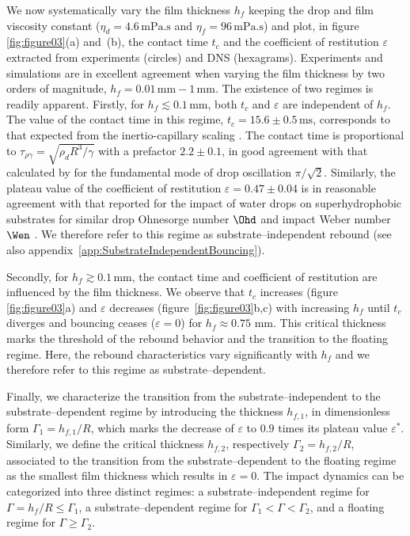 We now systematically vary the film thickness $h_{f}$ keeping the drop and film viscosity constant ($\eta_d = 4.6\,\si{\milli\pascal}.\si{\second}$ and $\eta_f = 96\,\si{\milli\pascal}.\si{\second}$) and plot, in figure \ref{fig:figure03}(a) and~(b), the contact time $t_c$ and the coefficient of restitution $\varepsilon$ extracted from experiments (circles) and  DNS (hexagrams). Experiments and simulations are in excellent agreement when varying the film thickness by two orders of magnitude, $h_{f} = 0.01\,\si{\milli\meter} - 1\,\si{\milli\meter}$. The existence of two regimes is readily apparent. 
Firstly, for $h_{f} \lesssim 0.1\,\si{\milli\meter}$, both $t_{c}$ and $\varepsilon$ are independent of $h_f$. The value of the contact time in this regime, $t_c = 15.6 \pm 0.5\,\si{\milli\second}$, corresponds to that expected from the inertio-capillary scaling \citep{wachters1966heat, richard2002contact}. The contact time is proportional to $\tau_{\rho\gamma} = \sqrt{\rho_d R^3/ \gamma}$ with a prefactor $2.2 \pm 0.1$, in good agreement with that calculated by \citet{rayleigh1879capillary} for the fundamental mode of drop oscillation $\pi/\sqrt 2$. Similarly, the plateau value of the coefficient of restitution $\varepsilon = 0.47 \pm 0.04$ is in reasonable agreement with that reported for the impact of water drops on superhydrophobic substrates for similar drop Ohnesorge number $\Ohd$ and impact Weber number $\Wen$ \citep{jha2020viscous}. We therefore refer to this regime as substrate--independent rebound (see also appendix~\ref{app:SubstrateIndependentBouncing}). 

Secondly, for $h_{f} \gtrsim 0.1\,\si{\milli\meter}$, the contact time and coefficient of restitution are influenced by the film thickness. We observe that $t_c$ increases (figure \ref{fig:figure03}a) and $\varepsilon$ decreases (figure~\ref{fig:figure03}b,c) with increasing $h_f$ until $t_c$ diverges and bouncing ceases ($\varepsilon = 0$) for $h_f \approx 0.75$ mm. This critical thickness marks the threshold of the rebound behavior and the transition to the floating regime. Here, the rebound characteristics vary significantly with $h_f$ and we therefore refer to this regime as substrate--dependent.

Finally, we characterize the transition from the substrate--independent to the substrate--dependent regime by introducing the thickness $h_{f,1}$, in dimensionless form $\Gamma_1 = h_{f,1}/R$, which marks the decrease of $\varepsilon$ to $0.9$ times its plateau value $\varepsilon^*$. 
Similarly, we define the critical thickness $h_{f,2}$, respectively $\Gamma_2 = h_{f,2}/R$, associated to the transition from the substrate--dependent to the floating regime as the smallest film thickness which results in $\varepsilon = 0$. 
The impact dynamics can be categorized into three distinct regimes: a substrate--independent regime for $\Gamma = h_{f}/R \le \Gamma_1$, a substrate--dependent regime for $\Gamma_1 < \Gamma < \Gamma_2$, and a floating regime for $\Gamma \ge \Gamma_2$.

